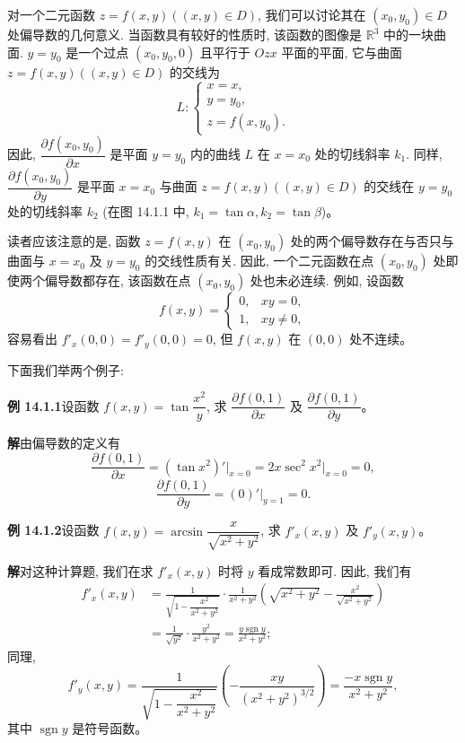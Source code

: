 \documentclass[UTF8,12pt,a4paper,fontset=fandol]{ctexart}
\begin{document}
对一个二元函数 $z=f(x,y)((x,y)\in D)$, 我们可以讨论其在 $(x_0,y_0)\in D$ 处偏导数的几何意义. 当函数具有较好的性质时, 该函数的图像是 $\mathbb R^3$ 中的一块曲面. $y=y_0$ 是一个过点 $(x_0,y_0,0)$ 且平行于 $Ozx$ 平面的平面, 它与曲面 $z=f(x,y)((x,y)\in D)$ 的交线为
\[
  L:\begin{cases}
    x=x,\\
    y=y_0,\\
    z=f(x,y_0).
  \end{cases}
\]
因此, $\dfrac{\partial f(x_0,y_0)}{\partial x}$ 是平面 $y=y_0$ 内的曲线 $L$ 在 $x=x_0$ 处的切线斜率 $k_1$. 同样, $\dfrac{\partial f(x_0,y_0)}{\partial y}$ 是平面 $x=x_0$ 与曲面 $z=f(x,y)((x,y)\in D)$ 的交线在 $y=y_0$ 处的切线斜率 $k_2$ (在图 14.1.1 中, $k_1=\tan\alpha, k_2=\tan\beta$)。

读者应该注意的是, 函数 $z=f(x,y)$ 在 $(x_0,y_0)$ 处的两个偏导数存在与否只与曲面与 $x=x_0$ 及 $y=y_0$ 的交线性质有关. 因此, 一个二元函数在点 $(x_0,y_0)$ 处即使两个偏导数都存在, 该函数在点 $(x_0,y_0)$ 处也未必连续. 例如, 设函数
\[
  f(x,y)=
  \begin{cases}
    0, & xy=0,\\
    1, & xy\ne0,
  \end{cases}
\]
容易看出 $f'_x(0,0)=f'_y(0,0)=0$, 但 $f(x,y)$ 在 $(0,0)$ 处不连续。

下面我们举两个例子:

\noindent\textbf{例 14.1.1}\quad 设函数 $f(x,y)=\tan\dfrac{x^2}{y}$, 求 $\dfrac{\partial f(0,1)}{\partial x}$ 及 $\dfrac{\partial f(0,1)}{\partial y}$。

\noindent\textbf{解}\quad 由偏导数的定义有
\[
  \frac{\partial f(0,1)}{\partial x}
  =(\tan x^2)'\big|_{x=0}
  =2x\sec^2 x^2\big|_{x=0}=0,
\]
\[
  \frac{\partial f(0,1)}{\partial y}
  =(0)'\big|_{y=1}=0.
\]

\noindent\textbf{例 14.1.2}\quad 设函数 $f(x,y)=\arcsin\dfrac{x}{\sqrt{x^2+y^2}}$, 求 $f'_x(x,y)$ 及 $f'_y(x,y)$。

\noindent\textbf{解}\quad 对这种计算题, 我们在求 $f'_x(x,y)$ 时将 $y$ 看成常数即可. 因此, 我们有
\[
\begin{aligned}
  f'_x(x,y)
  &=
  \frac{1}{\sqrt{1-\dfrac{x^2}{x^2+y^2}}}\cdot
  \frac{1}{x^2+y^2}
  \left(\sqrt{x^2+y^2}-\frac{x^2}{\sqrt{x^2+y^2}}\right)\\
  &=\frac{1}{\sqrt{y^2}}\cdot\frac{y^2}{x^2+y^2}
  =\frac{y\operatorname{sgn} y}{x^2+y^2};
\end{aligned}
\]
同理,
\[
  f'_y(x,y)
  =
  \frac{1}{\sqrt{1-\dfrac{x^2}{x^2+y^2}}}
  \left(-\frac{xy}{(x^2+y^2)^{3/2}}\right)
  =\frac{-x\operatorname{sgn} y}{x^2+y^2},
\]
其中 $\operatorname{sgn} y$ 是符号函数。
\end{document}
